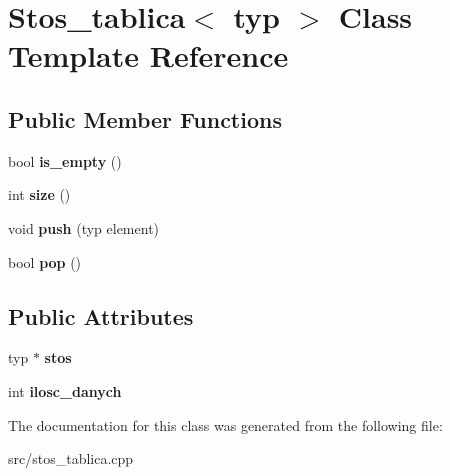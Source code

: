 \hypertarget{class_stos__tablica}{\section{Stos\-\_\-tablica$<$ typ $>$ Class Template Reference}
\label{class_stos__tablica}
}
\subsection*{Public Member Functions}
\begin{DoxyCompactItemize}
\item 
\hypertarget{class_stos__tablica_a75f6b98ccd94ce7203aaa06ce8f744ea}{bool {\bfseries is\-\_\-empty} ()}\label{class_stos__tablica_a75f6b98ccd94ce7203aaa06ce8f744ea}

\item 
\hypertarget{class_stos__tablica_a771b5559055bb990616ebd6117f57665}{int {\bfseries size} ()}\label{class_stos__tablica_a771b5559055bb990616ebd6117f57665}

\item 
\hypertarget{class_stos__tablica_a2614aeeea45f47b532bab0f7933b7da1}{void {\bfseries push} (typ element)}\label{class_stos__tablica_a2614aeeea45f47b532bab0f7933b7da1}

\item 
\hypertarget{class_stos__tablica_a1488105d535a6afc7eb137a0dc939c9a}{bool {\bfseries pop} ()}\label{class_stos__tablica_a1488105d535a6afc7eb137a0dc939c9a}

\end{DoxyCompactItemize}
\subsection*{Public Attributes}
\begin{DoxyCompactItemize}
\item 
\hypertarget{class_stos__tablica_a5cb6d7ec12f87fb73eb125e49937259f}{typ $\ast$ {\bfseries stos}}\label{class_stos__tablica_a5cb6d7ec12f87fb73eb125e49937259f}

\item 
\hypertarget{class_stos__tablica_a7e162ab7f8657a1f60f6aef05f54394a}{int {\bfseries ilosc\-\_\-danych}}\label{class_stos__tablica_a7e162ab7f8657a1f60f6aef05f54394a}

\end{DoxyCompactItemize}


The documentation for this class was generated from the following file\-:\begin{DoxyCompactItemize}
\item 
src/stos\-\_\-tablica.\-cpp\end{DoxyCompactItemize}
